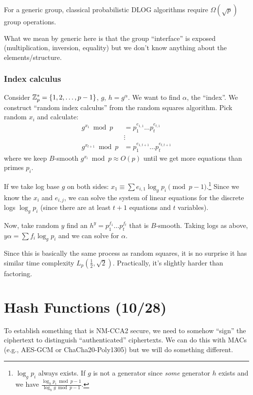 \documentclass[notes]{agony}
\begin{document}
\begin{theorem}[Shoup]
  For a generic group, classical probabilistic DLOG algorithms
  require $\Omega(\sqrt{p})$ group operations.
\end{theorem}

What we mean by generic here is that the group ``interface''
is exposed (multiplication, inversion, equality) but we don't
know anything about the elements/structure.

\subsubsection*{Index calculus}

Consider $\mathbb{Z}_p^* = \{1,2,\dotsc,p-1\}$, $g$, $h = g^\alpha$.
We want to find $\alpha$, the ``index''.
We construct ``random index calculus'' from the random squares algorithm.
Pick random $x_i$ and calculate:
\begin{align*}
  g^{x_1} \bmod p     & = p_1^{e_{1,1}}\dots p_t^{e_{t,1}}     \\
                      & \vdots                                 \\
  g^{x_{t+1}} \bmod p & = p_1^{e_{1,t+1}}\dots p_t^{e_{t,t+1}}
\end{align*}
where we keep $B$-smooth $g^{x_i} \bmod p \approx O(p)$
until we get more equations than primes $p_i$.

If we take log base $g$ on both sides: $x_1 \equiv \sum e_{i,1}\log_g p_i \pmod{p-1}$.\footnote{
  $\log_g p_i$ always exists. If $g$ is not a generator
  since \emph{some} generator $h$ exists and we have
  $\frac{\log_h p_i \bmod p-1}{\log_h g \bmod p-1}$.}
Since we know the $x_i$ and $e_{i,j}$, we can solve the system of linear equations
for the discrete logs $\log_g p_i$ (since there are at least $t+1$ equations and $t$ variables).

Now, take random $y$ find an $h^y = p_1^{f_1}\dots p_t^{f_t}$ that is $B$-smooth.
Taking logs as above, $y\alpha = \sum f_i \log_g p_i$ and we can solve for $\alpha$.

Since this is basically the same process as random squares,
it is no surprise it has similar time complexity $L_p(\frac12,\sqrt2)$.
Practically, it's slightly harder than factoring.

\section{Hash Functions (10/28)}

To establish something that is NM-CCA2 secure, we need to somehow ``sign''
the ciphertext to distinguish ``authenticated'' ciphertexts.
We can do this with MACs (e.g., AES-GCM or ChaCha20-Poly1305)
but we will do something different.
\end{document}
